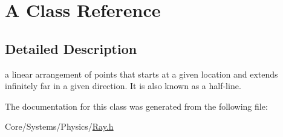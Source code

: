 \hypertarget{classA}{\section{A Class Reference}
\label{classA}
}


\subsection{Detailed Description}
a linear arrangement of points that starts at a given location and extends infinitely far in a given direction. It is also known as a half-\/line. 

The documentation for this class was generated from the following file\-:\begin{DoxyCompactItemize}
\item 
Core/\-Systems/\-Physics/\hyperlink{Ray_8h}{Ray.\-h}\end{DoxyCompactItemize}

